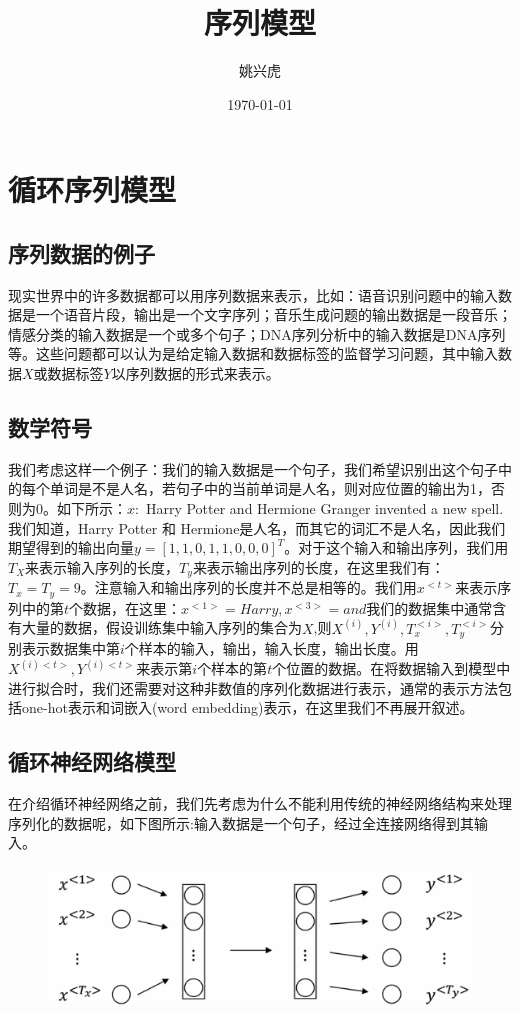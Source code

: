 \documentclass{ctexart}
\title{序列模型}
\author{姚兴虎}
\date{\today}
\begin{document}
\maketitle
\section{循环序列模型}
\subsection{序列数据的例子}
现实世界中的许多数据都可以用序列数据来表示，比如：语音识别问题中的输入数据是一个语音片段，输出是一个文字序列；音乐生成问题的输出数据是一段音乐；情感分类的输入数据是一个或多个句子；DNA序列分析中的输入数据是DNA序列等。这些问题都可以认为是给定输入数据和数据标签的监督学习问题，其中输入数据$X$或数据标签$Y$以序列数据的形式来表示。
\subsection{数学符号}
我们考虑这样一个例子：我们的输入数据是一个句子，我们希望识别出这个句子中的每个单词是不是人名，若句子中的当前单词是人名，则对应位置的输出为1，否则为0。如下所示：$x:$  Harry Potter and Hermione Granger invented a new spell.我们知道，Harry Potter 和 Hermione是人名，而其它的词汇不是人名，因此我们期望得到的输出向量$y=[1,1,0,1,1,0,0,0]^T$。对于这个输入和输出序列，我们用$T_X$来表示输入序列的长度，$T_y$来表示输出序列的长度，在这里我们有：$T_x = T_y =9$。注意输入和输出序列的长度并不总是相等的。我们用$x^{<t>}$来表示序列中的第$t$个数据，在这里：$x^{<1>}=Harry,x^{<3>}=and$我们的数据集中通常含有大量的数据，假设训练集中输入序列的集合为$X$,则$X^{(i)},Y^{(i)},T_x^{<i>},T_y^{<i>}$分别表示数据集中第$i$个样本的输入，输出，输入长度，输出长度。用$X^{(i)<t>},Y^{(i)<t>}$来表示第$i$个样本的第$t$个位置的数据。在将数据输入到模型中进行拟合时，我们还需要对这种非数值的序列化数据进行表示，通常的表示方法包括one-hot表示和词嵌入(word embedding)表示，在这里我们不再展开叙述。
\subsection{循环神经网络模型}
在介绍循环神经网络之前，我们先考虑为什么不能利用传统的神经网络结构来处理序列化的数据呢，如下图所示:输入数据是一个句子，经过全连接网络得到其输入。
\begin{figure}[ht]
\centering
\includegraphics[scale=0.6]{1.png}
\end{figure}
\end{document}

